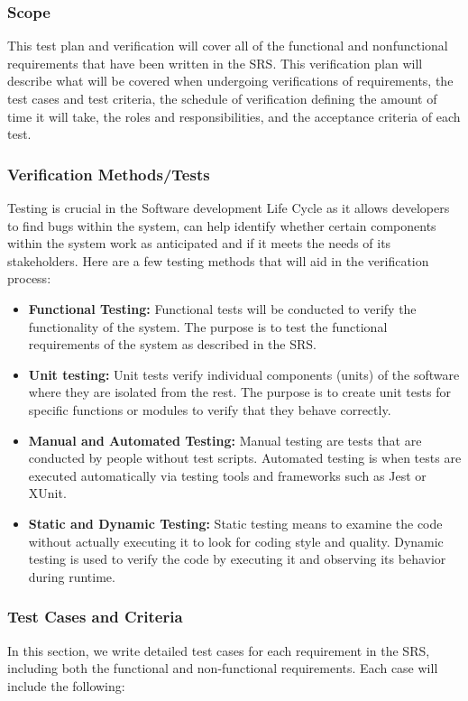 \documentclass[12pt, titlepage]{article}
\begin{document}
\subsubsection{Scope}
This test plan and verification will cover all of the functional and nonfunctional requirements that have been written in the SRS. This verification plan will describe what will be covered when undergoing verifications of requirements, the test cases and test criteria, the schedule of verification defining the amount of time it will take, the roles and responsibilities, and the acceptance criteria of each test.

\subsubsection{Verification Methods/Tests}
Testing is crucial in the Software development Life Cycle as it allows developers to find bugs within the system, can help identify whether certain components within the system work as anticipated and if it meets the needs of its stakeholders. Here are a few testing methods that will aid in the verification process:

\begin{itemize}
  \item \textbf{Functional Testing:} Functional tests will be conducted to verify the functionality of the system. The purpose is to test the functional requirements of the system as described in the SRS.
  \item \textbf{Unit testing:} Unit tests verify individual components (units) of the software where they are isolated from the rest. The purpose is to create unit tests for specific functions or modules to verify that they behave correctly.
  \item \textbf{Manual and Automated Testing:} Manual testing are tests that are conducted by people without test scripts. Automated testing is when tests are executed automatically via testing tools and frameworks such as Jest or XUnit.
  \item \textbf{Static and Dynamic Testing:} Static testing means to examine the code without actually executing it to look for coding style and quality. Dynamic testing is used to verify the code by executing it and observing its behavior during runtime.
\end{itemize}

\subsubsection{Test Cases and Criteria}
In this section, we write detailed test cases for each requirement in the SRS, including both the functional and non-functional requirements. Each case will include the following:
\end{document}
